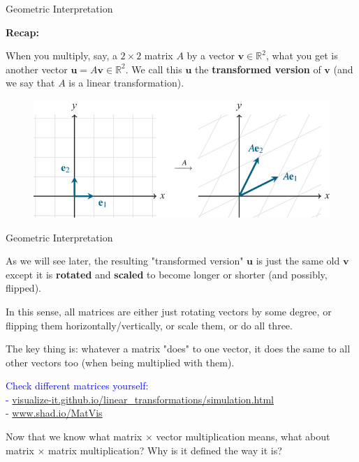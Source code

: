 \documentclass{beamer}
\newcommand{\vv}{\mathbf{v}}
\newcommand{\vu}{\mathbf{u}}
\newcommand{\R}{\mathbb{R}}
\begin{document}
\begin{frame}{Geometric Interpretation }

\textbf{Recap:}

When you multiply, say, a $2\times 2$ matrix $A$ by a vector $\vv\in\R^2$, what you get is another vector $\vu=A\vv\in\R^2$. We call this $\vu$ the \textbf{transformed version} of $\vv$ (and we say that $A$ is a linear transformation).

\begin{figure}
    \centering
    \includegraphics[width=0.75\linewidth]{viz ex.png}
    
    
\end{figure}

\end{frame}


\begin{frame}{Geometric Interpretation }

As we will see later, the resulting "transformed version" $\vu$ is just the same old $\vv$ except it is \textbf{rotated} and \textbf{scaled} to become longer or shorter (and possibly, flipped).

\pause 

\bigskip

In this sense, all  matrices are either just rotating vectors by some degree, or flipping them horizontally/vertically, or scale them, or do all three.

\smallskip 

The key thing is: whatever a matrix "does" to one vector, it does the same to all other vectors too (when being multiplied with them).

\bigskip
\bigskip


{\small
\textcolor{blue}{Check different matrices yourself:\\ - \url{visualize-it.github.io/linear_transformations/simulation.html} 
\\ - \url{www.shad.io/MatVis}
}}

\pause 

\bigskip 


Now that we know what matrix $\times$ vector multiplication means,  
what about matrix $\times$ matrix multiplication? Why is it defined the way it is?

    
\end{frame}
\end{document}
